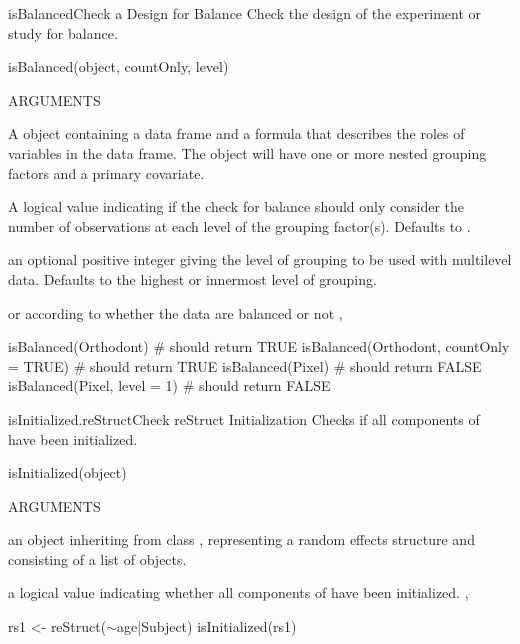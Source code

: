 \documentclass[pdftex]{article} \usepackage{url,graphicx}
\renewcommand{\Twiddle}{\mbox{\(\sim\)}}
\begin{document}
\begin{Helpfile}{isBalanced}{Check a Design for Balance}
Check the design of the experiment or study for balance.
\begin{Example}
isBalanced(object, countOnly, level)
\end{Example}
\begin{Argument}{ARGUMENTS}
\item[\Co{object:}]
A  object containing a data frame and a
formula that describes the roles of variables in the data frame.  The
object will have one or more nested grouping factors and a primary
covariate.
\item[\Co{countOnly:}]
A logical value indicating if the check for balance
should only consider the number of observations at each level of the
grouping factor(s).  Defaults to .
\item[\Co{level:}]
an optional positive integer giving the level of grouping
to be used with multilevel data. Defaults to the highest or
innermost level of grouping.
\end{Argument}
 or  according to whether the data are balanced
or not
, 
\need 15pt
\vspace{-16pt} 
\begin{Example}
isBalanced(Orthodont)                    # should return TRUE
isBalanced(Orthodont, countOnly = TRUE)  # should return TRUE
isBalanced(Pixel)                        # should return FALSE
isBalanced(Pixel, level = 1)             # should return FALSE
\end{Example}
\end{Helpfile}
\begin{Helpfile}{isInitialized.reStruct}{Check reStruct Initialization}
Checks if all  components of  have been
initialized.
\begin{Example}
isInitialized(object)
\end{Example}
\begin{Argument}{ARGUMENTS}
\item[\Co{object:}]
an object inheriting from class ,
representing a random effects structure and consisting of a list of
 objects.
\end{Argument}
a logical value indicating whether all components of  have
been initialized.
, 
\need 15pt
\vspace{-16pt} 
\begin{Example}
rs1 <- reStruct(\Twiddle age|Subject)
isInitialized(rs1)
\end{Example}
\end{Helpfile}
\end{document}
